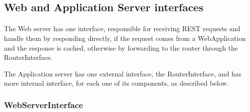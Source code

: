 			\subsection{Web and Application Server interfaces}
				\paragraph{}
					The Web server has one interface, responsible for receiving REST requests and handle them by responding directly, if the request comes from a WebApplication and the response is cached, otherwise by forwarding to the router through the RouterInterface. 
					
					The Application server has one external interface, the RouterInterface, and has more internal interface, for each one of its components, as described below.
				\subsubsection{WebServerInterface}
